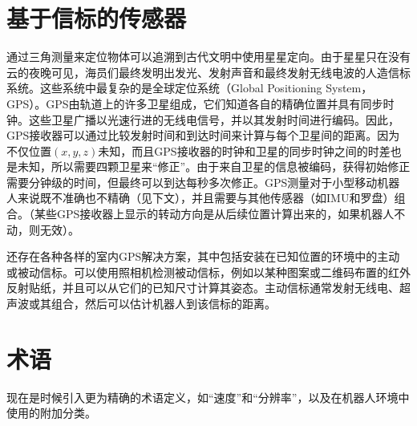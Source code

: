 \section{基于信标的传感器}
通过三角测量来定位物体可以追溯到古代文明中使用星星定向。由于星星只在没有云的夜晚可见，海员们最终发明出发光、发射声音和最终发射无线电波的人造信标系统。这些系统中最复杂的是全球定位系统（Global Positioning System，GPS）。GPS由轨道上的许多卫星组成，它们知道各自的精确位置并具有同步时钟。这些卫星广播以光速行进的无线电信号，并以其发射时间进行编码。因此，GPS接收器可以通过比较发射时间和到达时间来计算与每个卫星间的距离。因为不仅位置$(x, y, z)$未知，而且GPS接收器的时钟和卫星的同步时钟之间的时差也是未知，所以需要四颗卫星来“修正”。由于来自卫星的信息被编码，获得初始修正需要分钟级的时间，但最终可以到达每秒多次修正。GPS测量对于小型移动机器人来说既不准确也不精确（见下文），并且需要与其他传感器（如IMU和罗盘）组合。（某些GPS接收器上显示的转动方向是从后续位置计算出来的，如果机器人不动，则无效）。


还存在各种各样的室内GPS解决方案，其中包括安装在已知位置的环境中的主动或被动信标。可以使用照相机检测被动信标，例如以某种图案或二维码布置的红外反射贴纸，并且可以从它们的已知尺寸计算其姿态。主动信标通常发射无线电、超声波或其组合，然后可以估计机器人到该信标的距离。



\section{术语}
现在是时候引入更为精确的术语定义，如“速度”和“分辨率”，以及在机器人环境中使用的附加分类。



